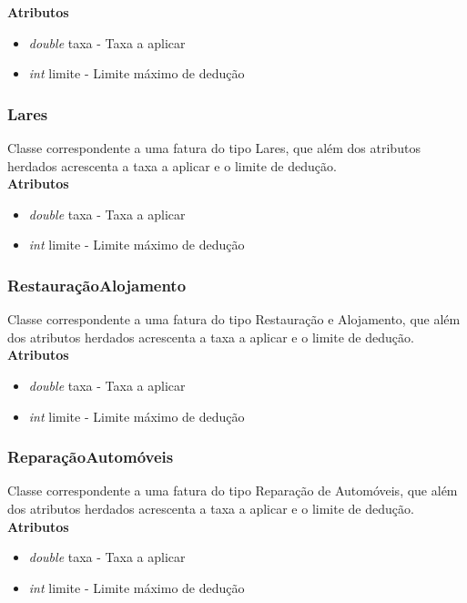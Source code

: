 \documentclass[10pt,a4paper]{article}
\begin{document}
{\bf{Atributos}}
\begin{itemize}
 \item \textit{double} taxa - Taxa a aplicar
 \item \textit{int} limite - Limite máximo de dedução
\end{itemize}

\subsubsection{Lares}

Classe correspondente a uma fatura do tipo Lares, que além dos atributos herdados acrescenta a taxa a aplicar e o limite de dedução.\\

{\bf{Atributos}}
\begin{itemize}
 \item \textit{double} taxa - Taxa a aplicar
 \item \textit{int} limite - Limite máximo de dedução
\end{itemize}

\subsubsection{RestauraçãoAlojamento}

Classe correspondente a uma fatura do tipo Restauração e Alojamento, que além dos atributos herdados acrescenta a taxa a aplicar e o limite de dedução.\\

{\bf{Atributos}}
\begin{itemize}
 \item \textit{double} taxa - Taxa a aplicar
 \item \textit{int} limite - Limite máximo de dedução
\end{itemize}

\subsubsection{ReparaçãoAutomóveis}

Classe correspondente a uma fatura do tipo Reparação de Automóveis, que além dos atributos herdados acrescenta a taxa a aplicar e o limite de dedução.\\

{\bf{Atributos}}
\begin{itemize}
 \item \textit{double} taxa - Taxa a aplicar
 \item \textit{int} limite - Limite máximo de dedução
\end{itemize}
\end{document}
